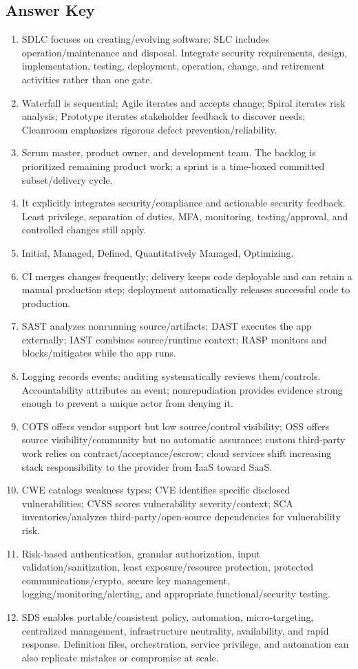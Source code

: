 \documentclass[10pt,letterpaper]{article}
\begin{document}
\subsection*{Answer Key}
{\small
\begin{enumerate}[nosep]
\item SDLC focuses on creating/evolving software; SLC includes operation/maintenance and disposal. Integrate security requirements, design, implementation, testing, deployment, operation, change, and retirement activities rather than one gate.
\item Waterfall is sequential; Agile iterates and accepts change; Spiral iterates risk analysis; Prototype iterates stakeholder feedback to discover needs; Cleanroom emphasizes rigorous defect prevention/reliability.
\item Scrum master, product owner, and development team. The backlog is prioritized remaining product work; a sprint is a time-boxed committed subset/delivery cycle.
\item It explicitly integrates security/compliance and actionable security feedback. Least privilege, separation of duties, MFA, monitoring, testing/approval, and controlled changes still apply.
\item Initial, Managed, Defined, Quantitatively Managed, Optimizing.
\item CI merges changes frequently; delivery keeps code deployable and can retain a manual production step; deployment automatically releases successful code to production.
\item SAST analyzes nonrunning source/artifacts; DAST executes the app externally; IAST combines source/runtime context; RASP monitors and blocks/mitigates while the app runs.
\item Logging records events; auditing systematically reviews them/controls. Accountability attributes an event; nonrepudiation provides evidence strong enough to prevent a unique actor from denying it.
\item COTS offers vendor support but low source/control visibility; OSS offers source visibility/community but no automatic assurance; custom third-party work relies on contract/acceptance/escrow; cloud services shift increasing stack responsibility to the provider from IaaS toward SaaS.
\item CWE catalogs weakness types; CVE identifies specific disclosed vulnerabilities; CVSS scores vulnerability severity/context; SCA inventories/analyzes third-party/open-source dependencies for vulnerability risk.
\item Risk-based authentication, granular authorization, input validation/sanitization, least exposure/resource protection, protected communications/crypto, secure key management, logging/monitoring/alerting, and appropriate functional/security testing.
\item SDS enables portable/consistent policy, automation, micro-targeting, centralized management, infrastructure neutrality, availability, and rapid response. Definition files, orchestration, service privilege, and automation can also replicate mistakes or compromise at scale.
\end{enumerate}
}
\end{document}
